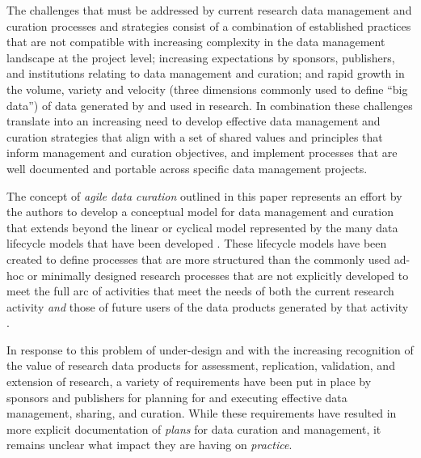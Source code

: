 \documentclass[paper]{ijdc-v9}
\begin{document}
The challenges that must be addressed by current research data
management and curation processes and strategies consist of a
combination of established practices that are not compatible with
increasing complexity in the data management landscape at the project
level; increasing expectations by sponsors, publishers, and institutions
relating to data management and curation; and rapid growth in the
volume, variety and velocity (three dimensions commonly used to define
``big data'') of data generated by and used in research. In combination
these challenges translate into an increasing need to develop effective
data management and curation strategies that align with a set of shared
values and principles that inform management and curation objectives,
and implement processes that are well documented and portable across
specific data management projects.

The concept of \emph{agile data curation} outlined in this paper
represents an effort by the authors to develop a conceptual model for
data management and curation that extends beyond the linear or cyclical
model represented by the many data lifecycle models that have been
developed
\autocites{ball_review_2012}{park_session_2016}{moller_lifecycle_2013}{working_group_on_information_systems_and_services_data_data_stewardship_interest_group_data_2011}.
These lifecycle models have been created to define processes that are
more structured than the commonly used ad-hoc or minimally designed
research processes that are not explicitly developed to meet the full
arc of activities that meet the needs of both the current research
activity \emph{and} those of future users of the data products generated
by that activity
\autocites{kervin_common_2013}{white_considering_2010}{tenopir_data_2011}{akers_disciplinary_2013}{kennan_research_2015}{vines_availability_2014}.

In response to this problem of under-design and with the increasing
recognition of the value of research data products for assessment,
replication, validation, and extension of research, a variety of
requirements have been put in place by sponsors
\autocites{office_of_management_and_budget_omb_digital_2012}{office_of_management_and_budget_omb_memorandum_2013}{office_of_management_and_budget_omb_memorandum_2009}{obama_77_2012}{obama_executive_2013}{obama_transparency_2009}
and publishers \autocites{_availability_2016}[
]{public_library_of_science_plos_data_2016} for planning for and
executing effective data management, sharing, and curation. While these
requirements have resulted in more explicit documentation of
\emph{plans} for data curation and management, it remains unclear what
impact they are having on \emph{practice}.
\end{document}
